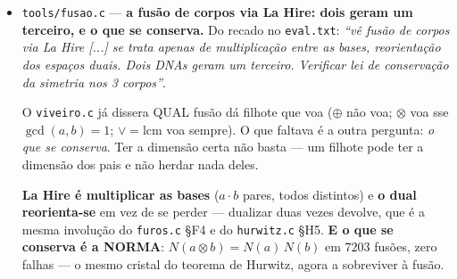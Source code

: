 \documentclass[11pt]{article}
\newcommand{\code}[1]{\texttt{\small #1}}
\theoremstyle{plain}
\theoremstyle{remark}
\begin{document}
\begin{itemize}
\textbf{E a espiral é o dual do cone} --- que foi a correção do Aarão a uma pergunta que a versão anterior tinha
feito ao contrário. media se o percurso \emph{era} espiral (raio monótono); mas \emph{``se
preenche o plano, desenha espiral também''}, e medir isso é medir a coisa errada. O que se mede é a
dualidade: a hélice $(t\cos t, t\sin t, t)$ vive \emph{no} cone $x^2+y^2=z^2$ ($40$ pontos, resíduo
nulo) e a sua sombra em $z=0$ é a espiral de Arquimedes $r=t$, exata. \emph{A espiral é o que o cone
projeta} --- como o grafeno e o estanho, um par em que o de baixo é a sombra do de cima. E a curva
que enche contém-na por cobertura: $200$ de $200$ pontos em células visitadas.

\emph{E duas correções do Aarão que a medida confirmou.} A primeira: \emph{``na verdade é Cantor dos
dois lados''} --- e é, porque $g(i)$ é uma fita tal como $i$ é; o que os liga é uma bijeção, e Julia
não é um lado mas o que \emph{acontece} neles. A segunda: \emph{``o pó não gera o plano sozinho, as
duas operações são duas coordenadas que enchem o plano; a cifra é a deformação dual''} --- medido:
$\dim$ Cantor $= 0{,}6309 < 1$, mas a mesma fita repartida em pares e ímpares cobre
\textbf{$100\%$} das células do quadrado, em $2$ a $12$ bits. É a curva de Hilbert, e a cifra não
descreve o pó: \emph{deforma-o até ele encher}.

\item \code{tools/fusao.c} --- \textbf{a fusão de corpos via La Hire: dois geram um terceiro, e o
que se conserva.} Do recado no \code{eval.txt}: \emph{``vê fusão de corpos via La Hire [...] se
trata apenas de multiplicação entre as bases, reorientação dos espaços duais. Dois DNAs geram um
terceiro. Verificar lei de conservação da simetria nos 3 corpos''}.

O \code{viveiro.c} já dissera QUAL fusão dá filhote que voa ($\oplus$ não voa; $\otimes$ voa sse
$\gcd(a,b)=1$; $\vee=\mathrm{lcm}$ voa sempre). O que faltava é a outra pergunta: \emph{o que se
conserva}. Ter a dimensão certa não basta --- um filhote pode ter a dimensão dos pais e não herdar
nada deles.

\textbf{La Hire é multiplicar as bases} ($a\cdot b$ pares, todos distintos) e \textbf{o dual
reorienta-se} em vez de se perder --- dualizar duas vezes devolve, que é a mesma involução do
\code{furos.c} §F4 e do \code{hurwitz.c} §H5. \textbf{E o que se conserva é a NORMA}:
$N(a\otimes b)=N(a)\,N(b)$ em $7203$ fusões, zero falhas --- o mesmo cristal do teorema de Hurwitz,
agora a sobreviver à fusão.


\end{itemize}
\end{document}

